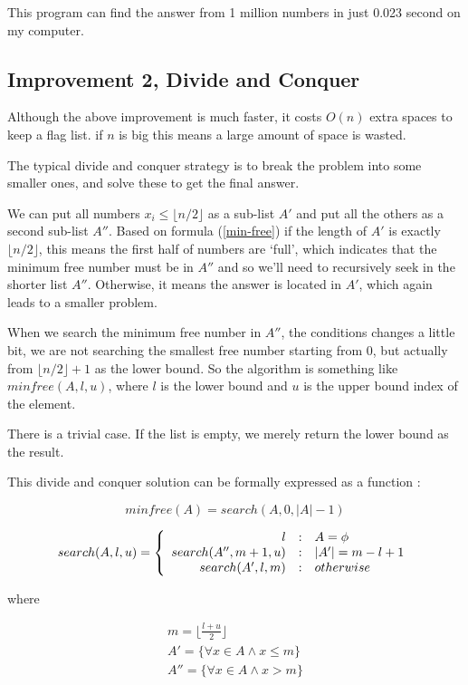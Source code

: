 \documentclass{article}
\begin{document}
This program can find the answer from 1 million numbers in just 0.023 second
on my computer.

\subsection{Improvement 2, Divide and Conquer}
Although the above improvement is much faster, it costs $O(n)$ extra
spaces to keep a flag list. if $n$ is big this means
a large amount of space is wasted.

The typical divide and conquer strategy is to break the problem
into some smaller ones, and solve these to get the final answer.

We can put all numbers $x_i \leq \lfloor n/2 \rfloor$ as a sub-list $A'$ and put all the others as
a second sub-list $A''$. Based on formula (\ref{min-free}) if the length of $A'$ is exactly $\lfloor n/2 \rfloor$, this means
the first half of numbers are `full', which indicates that the
minimum free number must be in $A''$ and so we'll need to recursively seek
in the shorter list $A''$. Otherwise, it means the answer is located in $A'$, which again leads to a smaller problem.

When we search the minimum free number in $A''$, the conditions changes
a little bit, we are not searching the smallest free number starting from
$0$, but actually from $\lfloor n/2 \rfloor + 1$ as the lower bound.
So the algorithm is something like $minfree(A, l, u)$, where $l$ is
the lower bound and $u$ is the upper bound index of the element.

There is a trivial case. If the list is empty, we merely return the lower bound as the result.

This divide and conquer solution can be formally expressed
as a function :

\[
minfree(A) = search(A, 0, |A|-1)
\]

\[
search(A, l, u) = \left \{
       \begin{array}
       {r@{\quad:\quad}l}
       l & A = \phi \\
       search(A'', m+1, u) &  |A'| = m - l + 1 \\
       search(A',  l, m) & otherwise
       \end{array}
\right.
\]

where

\[ \begin{array}{l}
m = \displaystyle \lfloor \frac{l+u}{2} \rfloor \\
A'  = \{ \forall x \in A \wedge x \leq m \} \\
A'' = \{ \forall x \in A \wedge x > m \} \\
\end{array} \]
\end{document}
